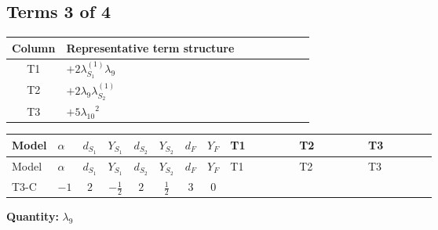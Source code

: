 \documentclass[8pt]{article}
\begin{document}
\begin{landscape}
\subsection*{Terms 3 of 4}
\begin{center}
\begin{tabular}{@{}c >{\raggedright\arraybackslash}p{0.82\linewidth}@{}}
\toprule
Column & Representative term structure \\
\midrule
T1 & \(\displaystyle +2 {\lambda_{S_1}^{(1)}} {\lambda_{9}}\) \\
\midrule
T2 & \(\displaystyle +2 {\lambda_{9}} {\lambda_{S_2}^{(1)}}\) \\
\midrule
T3 & \(\displaystyle +5 {\lambda_{10}}^2\) \\
\midrule
\bottomrule
\end{tabular}
\end{center}
\smallskip
\tiny
\begin{longtable}{@{}llcccccc >{\raggedright\arraybackslash}p{0.21\linewidth} >{\raggedright\arraybackslash}p{0.21\linewidth} >{\raggedright\arraybackslash}p{0.21\linewidth}@{}}
\toprule
Model & $\alpha$ & $d_{S_1}$ & $Y_{S_1}$ & $d_{S_2}$ & $Y_{S_2}$ & $d_F$ & $Y_F$ & T1 & T2 & T3 \\
\midrule
\endfirsthead
\toprule
Model & $\alpha$ & $d_{S_1}$ & $Y_{S_1}$ & $d_{S_2}$ & $Y_{S_2}$ & $d_F$ & $Y_F$ & T1 & T2 & T3 \\
\midrule
\endhead
T3-C & $-1$ & $2$ & $-\frac{1}{2}$ & $2$ & $\frac{1}{2}$ & $3$ & $0$ & \scriptsize\adjustbox{max width=\linewidth}{$\begin{gathered} +2 {\lambda_{S_1}^{(1)}} {\lambda_{9}}\end{gathered}$} & \scriptsize\adjustbox{max width=\linewidth}{$\begin{gathered} +2 {\lambda_{9}} {\lambda_{S_2}^{(1)}}\end{gathered}$} & \scriptsize\adjustbox{max width=\linewidth}{$\begin{gathered} +5 {\lambda_{10}}^2 \\ +5 {\lambda_{11}}^2\end{gathered}$} \\
\midrule
\bottomrule
\end{longtable}
\clearpage
\noindent\textbf{Quantity: }$\lambda_{9}$\par\smallskip

\end{landscape}
\end{document}
